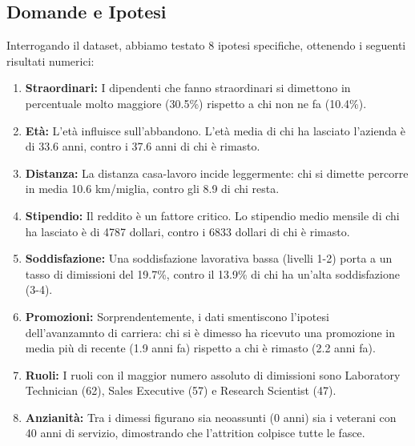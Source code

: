\documentclass[11pt, a4paper]{article}
\begin{document}
\subsection{Domande e Ipotesi}
Interrogando il dataset, abbiamo testato 8 ipotesi specifiche, ottenendo i seguenti risultati numerici:
\begin{enumerate}
    \item \textbf{Straordinari:} I dipendenti che fanno straordinari si dimettono in percentuale molto maggiore (30.5\%) rispetto a chi non ne fa (10.4\%).
    \item \textbf{Età:} L'età influisce sull'abbandono. L'età media di chi ha lasciato l'azienda è di 33.6 anni, contro i 37.6 anni di chi è rimasto.
    \item \textbf{Distanza:} La distanza casa-lavoro incide leggermente: chi si dimette percorre in media 10.6 km/miglia, contro gli 8.9 di chi resta.
    \item \textbf{Stipendio:} Il reddito è un fattore critico. Lo stipendio medio mensile di chi ha lasciato è di 4787 dollari, contro i 6833 dollari di chi è rimasto.
    \item \textbf{Soddisfazione:} Una soddisfazione lavorativa bassa (livelli 1-2) porta a un tasso di dimissioni del 19.7\%, contro il 13.9\% di chi ha un'alta soddisfazione (3-4).
    \item \textbf{Promozioni:} Sorprendentemente, i dati smentiscono l'ipotesi dell'avanzamnto di carriera: chi si è dimesso ha ricevuto una promozione in media più di recente (1.9 anni fa) rispetto a chi è rimasto (2.2 anni fa).
    \item \textbf{Ruoli:} I ruoli con il maggior numero assoluto di dimissioni sono Laboratory Technician (62), Sales Executive (57) e Research Scientist (47).
    \item \textbf{Anzianità:} Tra i dimessi figurano sia neoassunti (0 anni) sia i veterani con 40 anni di servizio, dimostrando che l'attrition colpisce tutte le fasce.
\end{enumerate}
\end{document}

